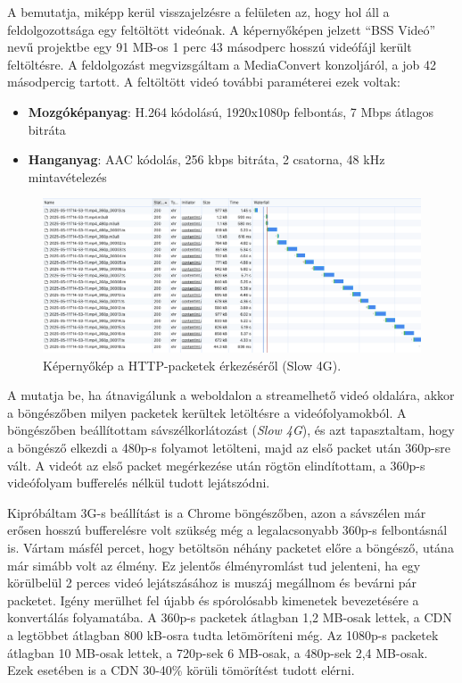 A  bemutatja, miképp kerül visszajelzésre a felületen az, hogy hol áll a feldolgozottsága egy feltöltött videónak. A képernyőképen jelzett ``BSS Videó'' nevű projektbe egy 91 MB-os 1 perc 43 másodperc hosszú videófájl került feltöltésre. A feldolgozást megvizsgáltam a MediaConvert konzoljáról, a job 42 másodpercig tartott. A feltöltött videó további paraméterei ezek voltak:

\begin{itemize}
  \setlength{\itemsep}{1pt}
  \setlength{\parskip}{0pt}
  \setlength{\parsep}{0pt}
  \item \textbf{Mozgóképanyag}: H.264 kódolású, 1920x1080p felbontás, 7 Mbps átlagos bitráta
  \item \textbf{Hanganyag}: AAC kódolás, 256 kbps bitráta, 2 csatorna, 48 kHz mintavételezés
\end{itemize}

\begin{figure}[h]
  \centering
  \includegraphics[width=150mm, keepaspectratio]{figures/browser_slow4g.png}
  \caption{Képernyőkép a HTTP-packetek érkezéséről (Slow 4G).}
  \label{fig:slow4g}
\end{figure}

A  mutatja be, ha átnavigálunk a weboldalon a streamelhető videó oldalára, akkor a böngészőben milyen packetek kerültek letöltésre a videófolyamokból. A böngészőben beállítottam sávszélkorlátozást (\emph{Slow 4G}), és azt tapasztaltam, hogy a böngésző elkezdi a 480p-s folyamot letölteni, majd az első packet után 360p-sre vált. A videót az első packet megérkezése után rögtön elindítottam, a 360p-s videófolyam bufferelés nélkül tudott lejátszódni.

Kipróbáltam 3G-s beállítást is a Chrome böngészőben, azon a sávszélen már erősen hosszú bufferelésre volt szükség még a legalacsonyabb 360p-s felbontásnál is. Vártam másfél percet, hogy betöltsön néhány packetet előre a böngésző, utána már simább volt az élmény. Ez jelentős élményromlást tud jelenteni, ha egy körülbelül 2 perces videó lejátszásához is muszáj megállnom és bevárni pár packetet. Igény merülhet fel újabb és spórolósabb kimenetek bevezetésére a konvertálás folyamatába.
A 360p-s packetek átlagban 1,2 MB-osak lettek, a CDN a legtöbbet átlagban 800 kB-osra tudta letömöríteni még. Az 1080p-s packetek átlagban 10 MB-osak lettek, a 720p-sek 6 MB-osak, a 480p-sek 2,4 MB-osak. Ezek esetében is a CDN 30-40\% körüli tömörítést tudott elérni.


